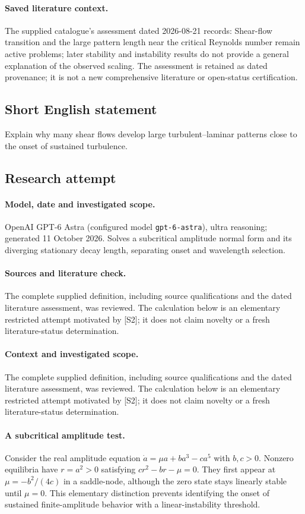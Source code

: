 \documentclass[11pt]{article}
\begin{document}
\paragraph{Saved literature context.} The supplied catalogue's assessment dated 2026-08-21 records: Shear-flow transition and the large pattern length near the critical Reynolds number remain active problems; later stability and instability results do not provide a general explanation of the observed scaling. The assessment is retained as dated provenance; it is not a new comprehensive literature or open-status certification.
\subsection{Short English statement}
Explain why many shear flows develop large turbulent--laminar patterns close to the onset of sustained turbulence.
\subsection{Research attempt}
\paragraph{Model, date and investigated scope.}
OpenAI GPT-6 Astra (configured model \texttt{gpt-6-astra}), ultra reasoning; generated 11 October 2026. Solves a subcritical amplitude normal form and its diverging stationary decay length, separating onset and wavelength selection.

\paragraph{Sources and literature check.}
The complete supplied definition, including source qualifications and the dated literature assessment, was reviewed. The calculation below is an elementary restricted attempt motivated by [S2]; it does not claim novelty or a fresh literature-status determination.

\paragraph{Context and investigated scope.} The complete supplied definition, including source qualifications and the dated literature assessment, was reviewed. The calculation below is an elementary restricted attempt motivated by [S2]; it does not claim novelty or a fresh literature-status determination.

\paragraph{A subcritical amplitude test.} Consider the real amplitude equation $\dot a=\mu a+ba^3-ca^5$ with $b,c>0$. Nonzero equilibria have $r=a^2>0$ satisfying $cr^2-br-\mu=0$. They first appear at $\mu=-b^2/(4c)$ in a saddle-node, although the zero state stays linearly stable until $\mu=0$. This elementary distinction prevents identifying the onset of sustained finite-amplitude behavior with a linear-instability threshold.
\end{document}
